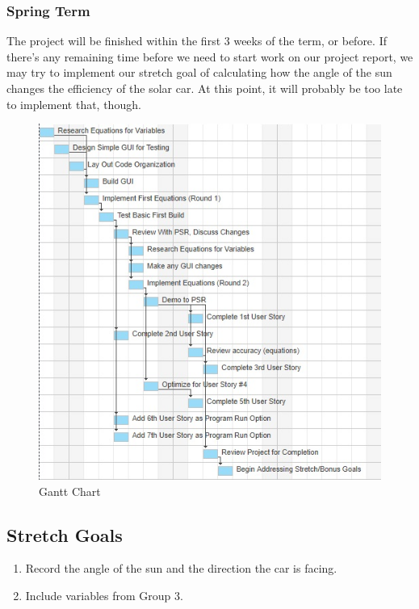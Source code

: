 \documentclass[onecolumn, draftclsnofoot,10pt, compsoc]{IEEEtran}
\begin{document}
\begin{singlespace}
        \subsubsection{Spring Term}
        The project will be finished within the first 3 weeks of the term, or before. If there's any remaining time before we need to start work on our project report, we may try to implement our stretch goal of calculating how the angle of the sun changes the efficiency of the solar car. At this point, it will probably be too late to implement that, though.
        
        \begin{figure}[!hb]
            \includegraphics{461Chartcut.jpg}
            \caption{Gantt Chart}
            \label{fig:Gantt}
        \end{figure}
        
    \subsection{Stretch Goals}
    \begin{enumerate}
        \item Record the angle of the sun and the direction the car is facing.
        \item Include variables from Group 3.
    \end{enumerate}
    
    

\end{singlespace}
\end{document}
